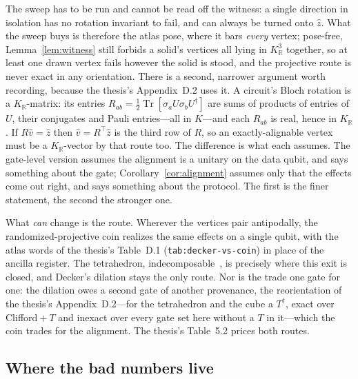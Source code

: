 \documentclass[11pt,a4paper]{article}
\DeclareMathOperator{\Tr}{Tr}
\newcommand{\R}{\mathbb{R}}
\begin{document}
The sweep has to be run and cannot be read off the witness: a single direction in isolation has no rotation invariant to fail, and can always be turned onto $\hat z$. What the sweep buys is therefore the atlas pose, where it bars \textit{every} vertex; pose-free, Lemma~\ref{lem:witness} still forbids a solid's vertices all lying in $K_\R^3$ together, so at least one drawn vertex fails however the solid is stood, and the projective route is never exact in any orientation. There is a second, narrower argument worth recording, because the thesis's Appendix~D.2 uses it. A circuit's Bloch rotation is a $K_\R$-matrix: its entries $R_{ab} = \tfrac12 \Tr[\sigma_a U \sigma_b U^\dagger]$ are sums of products of entries of $U$, their conjugates and Pauli entries---all in $K$---and each $R_{ab}$ is real, hence in $K_\R$. If $R\hat v = \hat z$ then $\hat v = R^\top \hat z$ is the third row of $R$, so an exactly-alignable vertex must be a $K_\R$-vector by that route too. The difference is what each assumes. The gate-level version assumes the alignment is a unitary on the data qubit, and says something about the gate; Corollary~\ref{cor:alignment} assumes only that the effects come out right, and says something about the protocol. The first is the finer statement, the second the stronger one.

What \textit{can} change is the route. Wherever the vertices pair antipodally, the randomized-projective coin realizes the same effects on a single qubit, with the atlas words of the thesis's Table~D.1 (\texttt{tab:decker-vs-coin}) in place of the ancilla register. The tetrahedron, indecomposable~\cite{dariano2005classicalrandomnessquantum}, is precisely where this exit is closed, and Decker's dilation stays the only route. Nor is the trade one gate for one: the dilation owes a second gate of another provenance, the reorientation of the thesis's Appendix~D.2---for the tetrahedron and the cube a $T^\dagger$, exact over Clifford${}+T$ and inexact over every gate set here without a $T$ in it---which the coin trades for the alignment. The thesis's Table~5.2 prices both routes.

\subsection{Where the bad numbers live}
\end{document}
